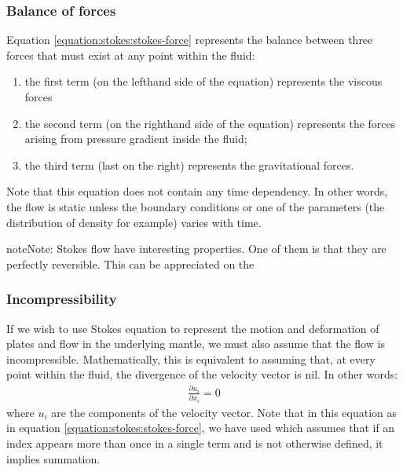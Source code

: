 \documentclass[letterpaper,10pt,english]{jupyterBook}
\begin{document}
\subsubsection{Balance of forces}
\label{\detokenize{stokes:balance-of-forces}}
\sphinxAtStartPar
Equation \eqref{equation:stokes:stokes-force} represents the balance between three forces that must exist at any point within the fluid:
\begin{enumerate}
%
\item {} 
\sphinxAtStartPar
the first term (on the left\sphinxhyphen{}hand side of the equation) represents the viscous forces

\item {} 
\sphinxAtStartPar
the second term (on the right\sphinxhyphen{}hand side of the equation) represents the forces arising from pressure gradient inside the fluid;

\item {} 
\sphinxAtStartPar
the third term (last on the right) represents the gravitational forces.

\end{enumerate}

\sphinxAtStartPar
Note that this equation does not contain any time dependency. In other words, the flow is static unless the boundary conditions or one of the parameters (the distribution of density for example) varies with time.

\begin{sphinxadmonition}{note}{Note:}
\sphinxAtStartPar
Stokes flow have interesting properties. One of them is that they are perfectly reversible. This can be appreciated on the 
\end{sphinxadmonition}


\subsubsection{Incompressibility}
\label{\detokenize{stokes:incompressibility}}
\sphinxAtStartPar
If we wish to use Stokes equation to represent the motion and deformation of plates and flow in the underlying mantle, we must also assume that the flow is incompressible. Mathematically, this is equivalent to assuming that, at every point within the fluid, the divergence of the velocity vector is nil. In other words:
\begin{equation}\label{equation:stokes:incompressibility}
\begin{split}\frac{\partial u_i}{\partial x_i}=0\end{split}
\end{equation}
\sphinxAtStartPar
where \(u_i\) are the components of the velocity vector. Note that in this equation as in equation \eqref{equation:stokes:stokes-force}, we have used  which assumes that if an index appears more than once in a single term and is not otherwise defined, it implies summation.
\end{document}
